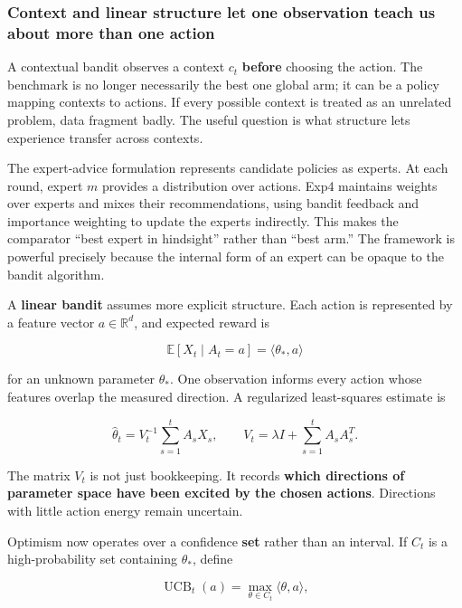 \subsubsection{Context and linear structure let one observation teach us about more than one action}\label{02-foundations-ii-ch029-context-and-linear-structure-let-one-observation-teach-us-about-more-than-one-action}

\hypertarget{02-foundations-ii-ch029-context-and-linear-structure-let-one-observation-teach-us-about-more-than-one-action}{}

A contextual bandit observes a context \(c_t\) \textbf{before} choosing the action. The benchmark is no longer necessarily the best one global arm; it can be a policy mapping contexts to actions. If every possible context is treated as an unrelated problem, data fragment badly. The useful question is what structure lets experience transfer across contexts.

The expert-advice formulation represents candidate policies as experts. At each round, expert \(m\) provides a distribution over actions. Exp4 maintains weights over experts and mixes their recommendations, using bandit feedback and importance weighting to update the experts indirectly. This makes the comparator ``best expert in hindsight'' rather than ``best arm.'' The framework is powerful precisely because the internal form of an expert can be opaque to the bandit algorithm.

A \textbf{linear bandit} assumes more explicit structure. Each action is represented by a feature vector \(a\in\mathbb R^d\), and expected reward is

\[
\mathbb E[X_t\mid A_t=a]
=
\langle \theta_*,a\rangle
\]

for an unknown parameter \(\theta_*\). One observation informs every action whose features overlap the measured direction. A regularized least-squares estimate is

\[
\hat\theta_t
=
V_t^{-1}
\sum_{s=1}^{t}A_sX_s,
\qquad
V_t
=
\lambda I+\sum_{s=1}^{t}A_sA_s^T.
\]

The matrix \(V_t\) is not just bookkeeping. It records \textbf{which directions of parameter space have been excited by the chosen actions}. Directions with little action energy remain uncertain.

Optimism now operates over a confidence \textbf{set} rather than an interval. If \(C_t\) is a high-probability set containing \(\theta_*\), define

\[
\operatorname{UCB}_t(a)
=
\max_{\theta\in C_t}
\langle\theta,a\rangle,
\]

